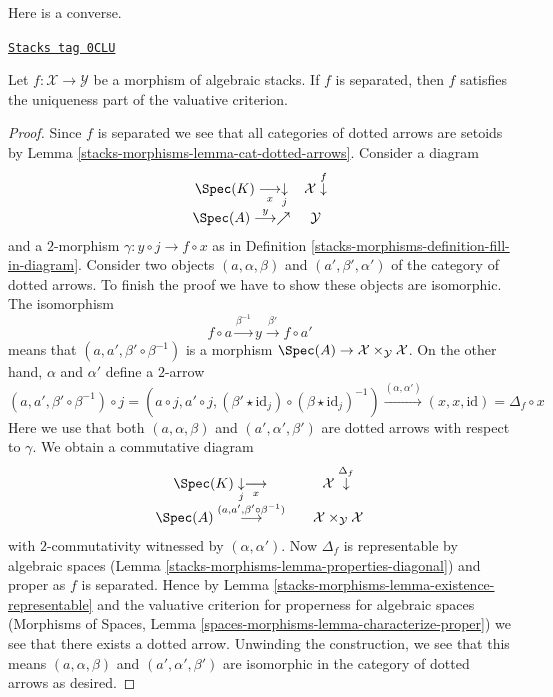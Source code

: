 Here is a converse.

\begin{lemma}
\label{stacks-morphisms-lemma-converse-uniqueness-and-diagonal}
\href{https://stacks.math.columbia.edu/tag/0CLU}{\texttt{Stacks tag 0CLU}}

Let $f : \mathcal{X} \to \mathcal{Y}$ be a morphism of algebraic stacks.
If $f$ is separated, then $f$ satisfies the
uniqueness part of the valuative criterion.
\end{lemma}

\begin{proof}
Since $f$ is separated we see that all categories of dotted arrows
are setoids by Lemma \ref{stacks-morphisms-lemma-cat-dotted-arrows}.
Consider a diagram
$$
\begin{array}{cc}\Spec(K) \underset{x}{\longrightarrow}\underset{j}{\downarrow} & \mathcal{X} \overset{f}{\downarrow} \\ \Spec(A) \overset{y}{\longrightarrow}\nearrow & \mathcal{Y}\end{array}
$$
and a $2$-morphism $\gamma : y \circ j \to f \circ x$ as in
Definition \ref{stacks-morphisms-definition-fill-in-diagram}. Consider two
objects $(a, \alpha, \beta)$ and $(a', \beta', \alpha')$
of the category of dotted arrows. To finish the proof we
have to show these objects are isomorphic. The isomorphism
$$
f \circ a \xrightarrow{\beta^{-1}} y \xrightarrow{\beta'} f \circ a'
$$
means that $(a, a', \beta' \circ \beta^{-1})$ is a morphism
$\Spec(A) \to \mathcal{X} \times_\mathcal{Y} \mathcal{X}$.
On the other hand, $\alpha$ and $\alpha'$ define
a $2$-arrow
$$
(a, a', \beta' \circ \beta^{-1}) \circ j =
(a \circ j, a' \circ j,
(\beta' \star \text{id}_j) \circ (\beta \star \text{id}_j)^{-1})
\xrightarrow{(\alpha, \alpha')} (x, x, \text{id}) = \Delta_f \circ x
$$
Here we use that both $(a, \alpha, \beta)$ and $(a', \alpha', \beta')$
are dotted arrows with respect to $\gamma$.
We obtain a commutative diagram
$$
\begin{array}{ccc}\Spec(K) \underset{j}{\downarrow}\underset{x}{\longrightarrow} &  & \mathcal{X} \overset{\Delta_f}{\downarrow} \\ \Spec(A) \overset{(a, a', \beta' \circ \beta^{-1})}{\longrightarrow} &  & \mathcal{X} \times_\mathcal{Y} \mathcal{X}\end{array}
$$
with $2$-commutativity witnessed by $(\alpha, \alpha')$. Now
$\Delta_f$ is representable by algebraic spaces
(Lemma \ref{stacks-morphisms-lemma-properties-diagonal})
and proper as $f$ is separated. Hence by
Lemma \ref{stacks-morphisms-lemma-existence-representable}
and the valuative criterion for properness for algebraic spaces
(Morphisms of Spaces, Lemma \ref{spaces-morphisms-lemma-characterize-proper})
we see that there exists a dotted arrow.
Unwinding the construction, we see that this means
$(a, \alpha, \beta)$ and $(a', \alpha', \beta')$
are isomorphic in the category of dotted arrows as desired.
\end{proof}

